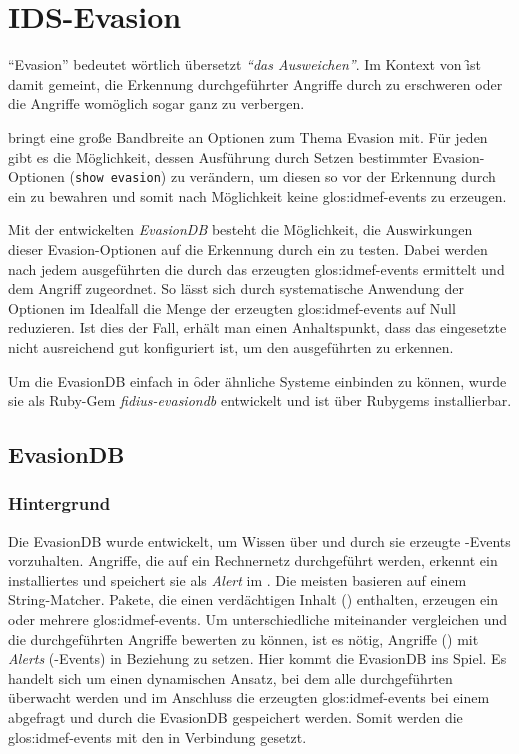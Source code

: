 \section{IDS-Evasion}
\label{sec:evasion-db}
\authors{\BK \and \JF}{\LM \and \DE \and \MW}

\enquote{Evasion} bedeutet wörtlich übersetzt \textit{\enquote{das
  Ausweichen}}. Im Kontext von \f ist damit gemeint,
die Erkennung durchgeführter Angriffe durch  zu erschweren
oder die Angriffe womöglich sogar ganz zu verbergen.

 bringt eine große Bandbreite an Optionen zum Thema Evasion
mit. Für jeden  gibt es die Möglichkeit, dessen Ausführung
durch Setzen bestimmter Evasion-Optionen (\texttt{show evasion}) zu
verändern, um diesen so vor der Erkennung durch ein  zu
bewahren und somit nach Möglichkeit keine \glspl{glos:idmef-event} zu
erzeugen.

Mit der entwickelten \textit{EvasionDB} besteht die Möglichkeit, die
Auswirkungen dieser Evasion-Optionen auf die Erkennung durch ein
 zu testen. Dabei werden nach jedem ausgeführten  die
durch das  erzeugten \glspl{glos:idmef-event} ermittelt und
dem Angriff zugeordnet. So lässt sich durch systematische Anwendung
der Optionen im Idealfall die Menge der erzeugten
\glspl{glos:idmef-event} auf Null reduzieren. Ist dies der Fall,
erhält man einen Anhaltspunkt, dass das eingesetzte  nicht
ausreichend gut konfiguriert ist, um den ausgeführten  zu
erkennen.

Um die EvasionDB einfach in \f oder ähnliche Systeme einbinden zu
können, wurde sie als Ruby-Gem \textit{fidius-evasiondb} entwickelt und
ist über Rubygems installierbar.

\subsection{EvasionDB}
\label{sec:idsevasion:evasiondb}

\subsubsection{Hintergrund}

Die EvasionDB wurde entwickelt, um Wissen über  und durch sie
erzeugte -Events vorzuhalten. Angriffe, die auf ein
Rechnernetz durchgeführt werden, erkennt ein installiertes 
und speichert sie als \textit{Alert} im . Die meisten
 basieren auf einem String-Matcher. Pakete, die einen
verdächtigen Inhalt () enthalten, erzeugen ein oder mehrere
\glspl{glos:idmef-event}. Um unterschiedliche  miteinander
vergleichen und die durchgeführten Angriffe bewerten zu können, ist es
nötig, Angriffe () mit \textit{Alerts} (-Events) in
Beziehung zu setzen. Hier kommt die EvasionDB ins Spiel. Es handelt
sich um einen dynamischen Ansatz, bei dem alle durchgeführten 
überwacht werden und im Anschluss die erzeugten
\glspl{glos:idmef-event} bei einem  abgefragt und durch die
EvasionDB gespeichert werden. Somit werden die \glspl{glos:idmef-event}
mit den  in Verbindung gesetzt.

